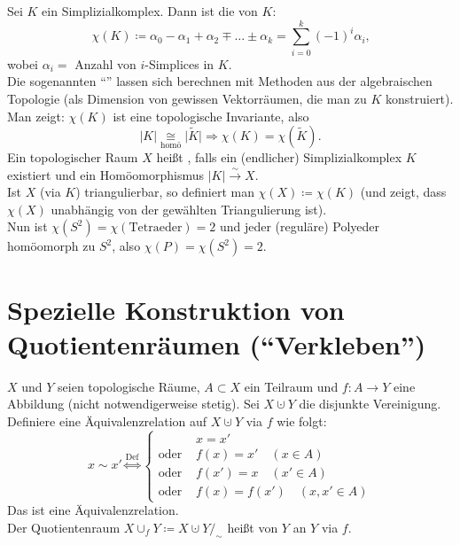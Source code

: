 \begin{definition}
  Sei \( K \) ein Simplizialkomplex. Dann ist die \label{def:eulercharakteristikSimplizialkomplex} von \( K \):
  \begin{equation*}
    \chi(K) \coloneqq \alpha_0-\alpha_1+\alpha_2 \mp \dots \pm \alpha_k = \sum_{i = 0}^k {(-1)}^i\alpha_i\text{,}
  \end{equation*}
  wobei \( \alpha_i = \) Anzahl von \( i \)-Simplices in \( K \). \\
  Die sogenannten ``''\label{def:bettiZahlen} lassen sich berechnen mit Methoden aus der algebraischen Topologie (als Dimension von gewissen Vektorräumen, die man zu \( K \) konstruiert). \\
  Man zeigt: \( \chi(K) \) ist eine topologische Invariante, also 
  \begin{equation*}
    \vert K \vert \underset{\text{homö}}{\cong} \vert \widetilde{K} \vert \Rightarrow \chi(K) = \chi(\widetilde{K})\text{.}
  \end{equation*}
  Ein topologischer Raum \( X \) heißt \label{def:triangulierbar}, falls ein (endlicher) Simplizialkomplex \( K \) existiert und ein Homöomorphismus \( \vert K \vert \overset{\sim}{\to} X \). \\
  Ist \( X \) (via \( K \)) triangulierbar, so definiert man \( \chi(X) \coloneqq \chi(K) \) (und zeigt, dass \( \chi(X) \) unabhängig von der gewählten Triangulierung ist). \\
  Nun ist \( \chi(S^2) = \chi(\text{Tetraeder}) = 2 \) und jeder (reguläre) Polyeder homöomorph zu \( S^2 \), also \( \chi(P) = \chi(S^2) = 2 \).
\end{definition}

\section{Spezielle Konstruktion von Quotientenräumen (``Verkleben'')}

\begin{definition}[Verklebung]
  \( X \) und \( Y \) seien topologische Räume, \( A \subset X \) ein Teilraum und \( f: A \to Y \) eine Abbildung (nicht notwendigerweise stetig). Sei \( X \cupdot Y \) die disjunkte Vereinigung. Definiere eine Äquivalenzrelation auf \( X \cupdot Y \) via \( f \) wie folgt:
  \begin{equation*}
    x \sim x' \overset{\text{Def}}{\Leftrightarrow} \begin{cases}
      &x = x' \\
      \text{oder } &f(x) = x' \quad (x \in A) \\
      \text{oder } &f(x') = x \quad (x' \in A) \\
      \text{oder } &f(x) = f(x') \quad (x, x' \in A)
    \end{cases}
  \end{equation*}
  Das ist eine Äquivalenzrelation. \\
  Der Quotientenraum \( X \cup_f Y \coloneqq X \cupdot Y /_\sim \) heißt \label{def:verklebung} von \( Y \) an \( Y \) via \( f \).
\end{definition}

